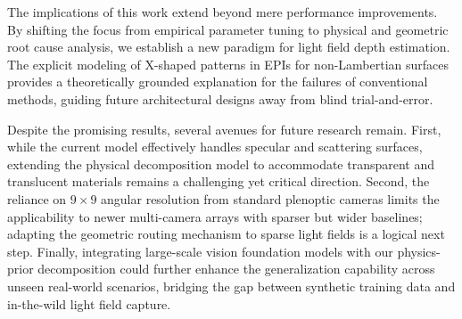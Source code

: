 \documentclass[lettersize,journal]{IEEEtran}
\begin{document}
The implications of this work extend beyond mere performance improvements. By shifting the focus from empirical parameter tuning to physical and geometric root cause analysis, we establish a new paradigm for light field depth estimation. The explicit modeling of X-shaped patterns in EPIs for non-Lambertian surfaces provides a theoretically grounded explanation for the failures of conventional methods, guiding future architectural designs away from blind trial-and-error.

Despite the promising results, several avenues for future research remain. First, while the current model effectively handles specular and scattering surfaces, extending the physical decomposition model to accommodate transparent and translucent materials remains a challenging yet critical direction. Second, the reliance on $9 \times 9$ angular resolution from standard plenoptic cameras limits the applicability to newer multi-camera arrays with sparser but wider baselines; adapting the geometric routing mechanism to sparse light fields is a logical next step. Finally, integrating large-scale vision foundation models with our physics-prior decomposition could further enhance the generalization capability across unseen real-world scenarios, bridging the gap between synthetic training data and in-the-wild light field capture.



\end{document}
